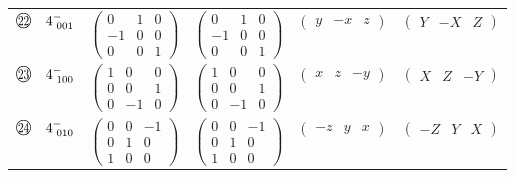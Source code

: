 \documentclass[fleqn,10pt,landscape]{jsarticle}
\begin{document}
\begin{center}
\begin{longtable}{lcccc}
$ {\ooalign{\hfil\resizebox{.8\width}{\height}{22}\hfil\crcr\raise.1ex\hbox{\large$\bigcirc$}}}\quad 4^{-}_{\,\,001} $ & $ \begin{pmatrix} 0 & 1 & 0 \\ -1 & 0 & 0 \\ 0 & 0 & 1 \end{pmatrix} $ & $ \begin{pmatrix} 0 & 1 & 0 \\ -1 & 0 & 0 \\ 0 & 0 & 1 \end{pmatrix} $ & $ \begin{pmatrix} y & - x & z \end{pmatrix} $ & $ \begin{pmatrix} Y & - X & Z \end{pmatrix} $ \\
$ {\ooalign{\hfil\resizebox{.8\width}{\height}{23}\hfil\crcr\raise.1ex\hbox{\large$\bigcirc$}}}\quad 4^{-}_{\,\,100} $ & $ \begin{pmatrix} 1 & 0 & 0 \\ 0 & 0 & 1 \\ 0 & -1 & 0 \end{pmatrix} $ & $ \begin{pmatrix} 1 & 0 & 0 \\ 0 & 0 & 1 \\ 0 & -1 & 0 \end{pmatrix} $ & $ \begin{pmatrix} x & z & - y \end{pmatrix} $ & $ \begin{pmatrix} X & Z & - Y \end{pmatrix} $ \\
$ {\ooalign{\hfil\resizebox{.8\width}{\height}{24}\hfil\crcr\raise.1ex\hbox{\large$\bigcirc$}}}\quad 4^{-}_{\,\,010} $ & $ \begin{pmatrix} 0 & 0 & -1 \\ 0 & 1 & 0 \\ 1 & 0 & 0 \end{pmatrix} $ & $ \begin{pmatrix} 0 & 0 & -1 \\ 0 & 1 & 0 \\ 1 & 0 & 0 \end{pmatrix} $ & $ \begin{pmatrix} - z & y & x \end{pmatrix} $ & $ \begin{pmatrix} - Z & Y & X \end{pmatrix} $ \\
\end{longtable}
\end{center}
\end{document}
